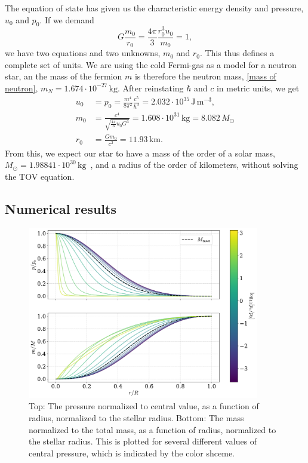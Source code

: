 The equation of state has given us the characteristic energy density and pressure, $u_0$ and $p_0$. 
If we demand
%
\begin{equation}
    G \frac{m_0}{r_0} = \frac{4 \pi }{3}\frac{r_0^3 u_0}{m_0} = 1,
\end{equation}
%
we have two equations and two unknowns, $m_0$ and $r_0$.
This thus defines a complete set of units.
We are using the cold Fermi-gas as a model for a neutron star, an the mass of the fermion $m$ is therefore the neutron mass, \autoref{mass of neutron}, $m_N = 1.674 \cdot 10^{-27} \, \text{kg}$.
After reinstating $\hbar$ and $c$ in metric units, we get
%
\begin{align}
    u_0 &= p_0 = \frac{m^4}{8 \pi^2}\frac{c^5}{\hbar^3} 
    = 2.032\cdot10^{35}  \, \text{J}\,\text{m}^{-3}, \\
    m_0 &= \frac{c^4}{\sqrt{\frac{4 \pi}{3} u_0 G^3} }
    = 1.608 \cdot 10^{31} \, \text{kg}
    = 8.082 \, M_\odot \\
    r_0 &= \frac{G m_0}{c^2} = 11.93 \, \text{km}. %
\end{align}
%
From this, we expect our star to have a mass of the order of a solar mass, $M_\odot = 1.988 41\cdot 10^{30}\, \text{kg}$~\autocite{particledatagroupReviewParticlePhysics2020}, and a radius of the order of kilometers, without solving the TOV equation.



\subsection{Numerical results}


\begin{figure}[!h]
    \centering
    \includegraphics[width=0.9\textwidth]{../scripts/figurer/pressure_mass.pdf}
    \caption{
        Top: The pressure normalized to central value, as a function of radius, normalized to the stellar radius.
        Bottom: The mass normalized to the total mass, as a function of radius, normalized to the stellar radius. 
        This is plotted for several different values of central pressure, which is indicated by the color shceme.
        }
    \label{fig: pressure and mass as a function of radius}
\end{figure}

